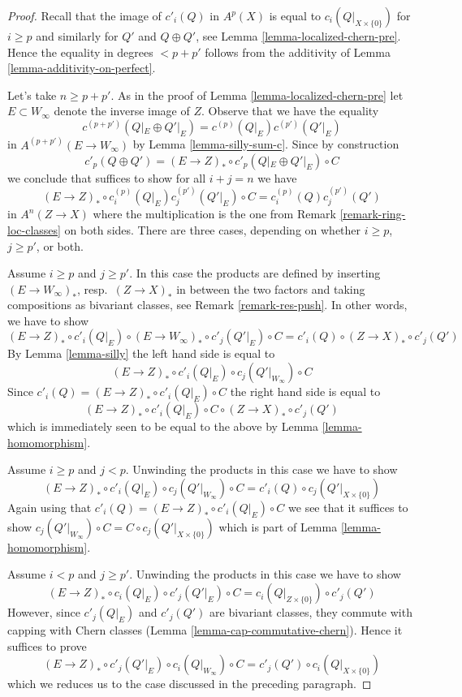 \begin{proof}
Recall that the image of $c'_i(Q)$ in $A^p(X)$ is equal to
$c_i(Q|_{X \times \{0\}})$ for $i \geq p$ and similarly for
$Q'$ and $Q \oplus Q'$, see Lemma \ref{lemma-localized-chern-pre}.
Hence the equality in degrees $< p + p'$ follows from the
additivity of Lemma \ref{lemma-additivity-on-perfect}.

\medskip\noindent
Let's take $n \geq p + p'$.
As in the proof of Lemma \ref{lemma-localized-chern-pre}
let $E \subset W_\infty$ denote the inverse image of $Z$.
Observe that we have the equality
$$
c^{(p + p')}(Q|_E \oplus Q'|_E) =
c^{(p)}(Q|_E)c^{(p')}(Q'|_E)
$$
in $A^{(p + p')}(E \to W_\infty)$ by Lemma \ref{lemma-silly-sum-c}.
Since by construction
$$
c'_p(Q \oplus Q') = (E \to Z)_* \circ c'_p(Q|_E \oplus Q'|_E) \circ C
$$
we conclude that suffices to show for all $i + j = n$ we have
$$
(E \to Z)_* \circ c^{(p)}_i(Q|_E)c^{(p')}_j(Q'|_E) \circ C
=
c^{(p)}_i(Q)c^{(p')}_j(Q')
$$
in $A^n(Z \to X)$ where the multiplication is the one from
Remark \ref{remark-ring-loc-classes} on both sides. There are
three cases, depending on whether $i \geq p$, $j \geq p'$, or both.

\medskip\noindent
Assume $i \geq p$ and $j \geq p'$. In this case the products are
defined by inserting $(E \to W_\infty)_*$, resp.\ $(Z \to X)_*$ in between
the two factors and taking compositions as bivariant classes, see
Remark \ref{remark-res-push}.
In other words, we have to show
$$
(E \to Z)_* \circ c'_i(Q|_E) \circ
(E \to W_\infty)_* \circ c'_j(Q'|_E) \circ C =
c'_i(Q) \circ (Z \to X)_* \circ c'_j(Q')
$$
By Lemma \ref{lemma-silly} the left hand side is equal to
$$
(E \to Z)_* \circ c'_i(Q|_E) \circ c_j(Q'|_{W_\infty}) \circ C
$$
Since $c'_i(Q) = (E \to Z)_* \circ c'_i(Q|_E) \circ C$
the right hand side is equal to
$$
(E \to Z)_* \circ c'_i(Q|_E) \circ C \circ (Z \to X)_* \circ c'_j(Q')
$$
which is immediately seen to be equal to the above
by Lemma \ref{lemma-homomorphism}.

\medskip\noindent
Assume $i \geq p$ and $j < p$. Unwinding the products
in this case we have to show
$$
(E \to Z)_* \circ c'_i(Q|_E) \circ c_j(Q'|_{W_\infty}) \circ C =
c'_i(Q) \circ c_j(Q'|_{X \times \{0\}})
$$
Again using that $c'_i(Q) = (E \to Z)_* \circ c'_i(Q|_E) \circ C$
we see that it suffices to show $c_j(Q'|_{W_\infty}) \circ C =
C \circ c_j(Q'|_{X \times \{0\}})$ which is part of
Lemma \ref{lemma-homomorphism}.

\medskip\noindent
Assume $i < p$ and $j \geq p'$. Unwinding the products
in this case we have to show
$$
(E \to Z)_* \circ c_i(Q|_E) \circ c'_j(Q'|_E) \circ C =
c_i(Q|_{Z \times \{0\}}) \circ c'_j(Q')
$$
However, since $c'_j(Q|_E)$ and $c'_j(Q')$ are
bivariant classes, they commute with capping with Chern classes
(Lemma \ref{lemma-cap-commutative-chern}). Hence it suffices to prove
$$
(E \to Z)_* \circ c'_j(Q'|_E) \circ c_i(Q|_{W_\infty}) \circ C =
c'_j(Q') \circ c_i(Q|_{X \times \{0\}})
$$
which we reduces us to the case discussed in the preceding paragraph.
\end{proof}

